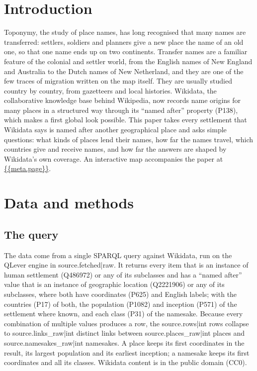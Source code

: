 \documentclass[11pt,a4paper]{article}
\begin{document}
\section{Introduction}
Toponymy, the study of place names, has long recognised that many names are transferred: settlers, soldiers and planners give a new place the name of an old one, so that one name ends up on two continents. Transfer names are a familiar feature of the colonial and settler world, from the English names of New England and Australia to the Dutch names of New Netherland, and they are one of the few traces of migration written on the map itself. They are usually studied country by country, from gazetteers and local histories. Wikidata, the collaborative knowledge base behind Wikipedia, now records name origins for many places in a structured way through its ``named after'' property (P138), which makes a first global look possible. This paper takes every settlement that Wikidata says is named after another geographical place and asks simple questions: what kinds of places lend their names, how far the names travel, which countries give and receive names, and how far the answers are shaped by Wikidata's own coverage. An interactive map accompanies the paper at \url{{{meta.page}}}.

\section{Data and methods}
\subsection{The query}
The data come from a single SPARQL query against Wikidata, run on the QLever engine \citep{qlever} in {{source.fetched|raw}}. It returns every item that is an instance of human settlement (Q486972) or any of its subclasses and has a ``named after'' value that is an instance of geographic location (Q2221906) or any of its subclasses, where both have coordinates (P625) and English labels; with the countries (P17) of both, the population (P1082) and inception (P571) of the settlement where known, and each class (P31) of the namesake. Because every combination of multiple values produces a row, the {{source.rows|int}} rows collapse to {{source.links_raw|int}} distinct links between {{source.places_raw|int}} places and {{source.namesakes_raw|int}} namesakes. A place keeps its first coordinates in the result, its largest population and its earliest inception; a namesake keeps its first coordinates and all its classes. Wikidata content is in the public domain (CC0).
\end{document}
